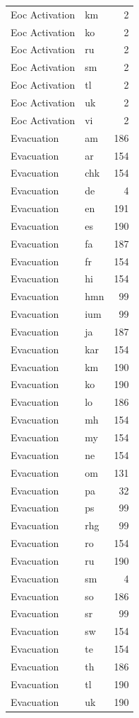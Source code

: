 \begin{longtable}{p{3cm} p{3cm} r}
Eoc Activation & km & 2 \\
Eoc Activation & ko & 2 \\
Eoc Activation & ru & 2 \\
Eoc Activation & sm & 2 \\
Eoc Activation & tl & 2 \\
Eoc Activation & uk & 2 \\
Eoc Activation & vi & 2 \\
Evacuation & am & 186 \\
Evacuation & ar & 154 \\
Evacuation & chk & 154 \\
Evacuation & de & 4 \\
Evacuation & en & 191 \\
Evacuation & es & 190 \\
Evacuation & fa & 187 \\
Evacuation & fr & 154 \\
Evacuation & hi & 154 \\
Evacuation & hmn & 99 \\
Evacuation & ium & 99 \\
Evacuation & ja & 187 \\
Evacuation & kar & 154 \\
Evacuation & km & 190 \\
Evacuation & ko & 190 \\
Evacuation & lo & 186 \\
Evacuation & mh & 154 \\
Evacuation & my & 154 \\
Evacuation & ne & 154 \\
Evacuation & om & 131 \\
Evacuation & pa & 32 \\
Evacuation & ps & 99 \\
Evacuation & rhg & 99 \\
Evacuation & ro & 154 \\
Evacuation & ru & 190 \\
Evacuation & sm & 4 \\
Evacuation & so & 186 \\
Evacuation & sr & 99 \\
Evacuation & sw & 154 \\
Evacuation & te & 154 \\
Evacuation & th & 186 \\
Evacuation & tl & 190 \\
Evacuation & uk & 190 \\

\end{longtable}
